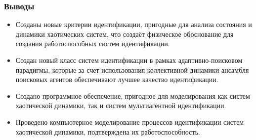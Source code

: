 \documentclass[10pt,utf8]{beamer}
\begin{document}

\begin{frame}
  \frametitle{Выводы}

  \begin{itemize}

    \item
      Созданы новые критерии идентификации,
      пригодные для анализа состояния и динамики хаотических систем, что создаёт
      физическое  обоснование для создания работоспособных систем идентификации.

    \item
      Создан новый класс систем идентификации в рамках адаптивно-поисковом парадигмы,
      которые за счет использования коллективной динамики ансамбля поисковых
      агентов обеспечивают лучшее качество идентификации.

    \item
      Создано программное обеспечение, пригодное для моделирования как систем
      хаотической динамики, так и систем мультиагентной идентификации.

    \item
      Проведено компьютерное моделирование процессов идентификации систем хаотической
      динамики, подтверждена их работоспособность.

  \end{itemize}


\end{frame}



%
%
%
\end{document}
